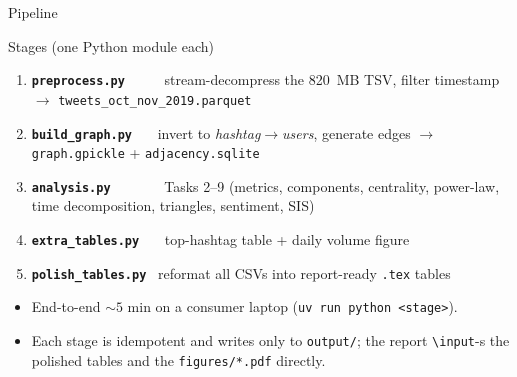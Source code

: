 \documentclass[aspectratio=169,10pt]{beamer}
\begin{document}
\begin{frame}{Pipeline}
  \footnotesize
  \begin{block}{Stages (one Python module each)}
    \begin{enumerate}\itemsep2pt
      \item \textbf{\texttt{preprocess.py}}~~~~~ stream-decompress
            the 820~MB TSV, filter timestamp \(\rightarrow\)
            \texttt{tweets\_oct\_nov\_2019.parquet}
      \item \textbf{\texttt{build\_graph.py}}~~~ invert to
            \emph{hashtag\(\to\)users}, generate edges \(\rightarrow\)
            \texttt{graph.gpickle} + \texttt{adjacency.sqlite}
      \item \textbf{\texttt{analysis.py}}~~~~~~~ Tasks 2--9
            (metrics, components, centrality, power-law,
            time decomposition, triangles, sentiment, SIS)
      \item \textbf{\texttt{extra\_tables.py}}~~~ top-hashtag
            table + daily volume figure
      \item \textbf{\texttt{polish\_tables.py}}~ reformat all
            CSVs into report-ready \texttt{.tex} tables
    \end{enumerate}
  \end{block}
  \vspace{2pt}
  \begin{itemize}\itemsep2pt
    \item \alert{End-to-end \(\sim\!5\) min} on a consumer
          laptop (\texttt{uv run python <\!stage>}).
    \item Each stage is idempotent and writes only to
          \texttt{output/}; the report \texttt{\textbackslash input}-s the polished
          tables and the \texttt{figures/*.pdf} directly.
  \end{itemize}
\end{frame}
\end{document}

